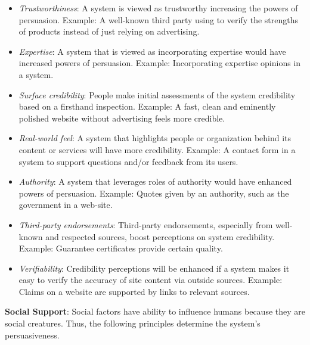 \begin{itemize}
\item \emph{Trustworthiness}:
A system is viewed as trustworthy increasing the powers of persuasion.
Example: A well-known third party using to verify the strengths of products instead of just relying on advertising.

\item \emph{Expertise}:
A system that is viewed as incorporating expertise would have increased powers of persuasion.
Example: Incorporating expertise opinions in a system.

\item \emph{Surface credibility}:
People make initial assessments of the system credibility based on a firsthand inspection.
Example: A fast, clean and eminently polished website without advertising feels more credible.

\item \emph{Real-world feel}:
A system that highlights people or organization behind its content or services will have more credibility.
Example: A contact form in a system to support questions and/or feedback from its users.

\item \emph{Authority}:
A system that leverages roles of authority would have enhanced powers of persuasion.
Example: Quotes given by an authority, such as the government in a web-site.

\item \emph{Third-party endorsements}:
Third-party endorsements, especially from well-known and respected sources, boost perceptions on system credibility.
Example: Guarantee certificates provide certain quality.

\item \emph{Verifiability}:
Credibility perceptions will be enhanced if a system makes it easy to verify the accuracy of site content via outside sources.
Example: Claims on a website are supported by links to relevant
sources.
\end{itemize}

\textbf{Social Support}:
Social factors have ability to influence humans because they are social creatures.
Thus, the following principles determine the system's persuasiveness.

